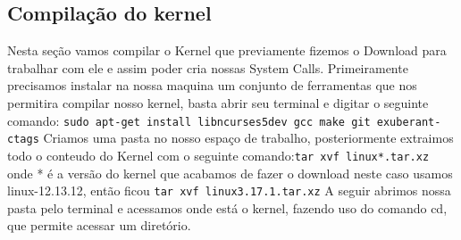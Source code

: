 \documentclass[12pt]{article}
\begin{document}
\subsection*{Compilação do kernel}
	Nesta seção vamos compilar o Kernel que previamente fizemos o Download para trabalhar com ele e assim poder cria nossas System Calls.
	Primeiramente precisamos instalar na nossa maquina um conjunto de ferramentas que nos permitira compilar nosso kernel, basta abrir seu terminal e digitar o seguinte comando:\newline
	\verb!sudo apt-­get install libncurses5­dev gcc make git exuberant­ctags! 
	\newline
	Criamos uma pasta no nosso espaço de trabalho, posteriormente extraimos todo o conteudo do Kernel com o seguinte comando:\newline \verb!tar xvf linux­­*.tar.xz! \newline onde * é a versão do kernel que acabamos de fazer o download neste caso usamos linux-12.13.12, então ficou\newline
	\verb!tar xvf linux­3.17.1.tar.xz!\newline
	A seguir abrimos nossa pasta pelo terminal e acessamos onde está o kernel, fazendo uso do comando cd, que permite acessar um diretório.
\end{document}
